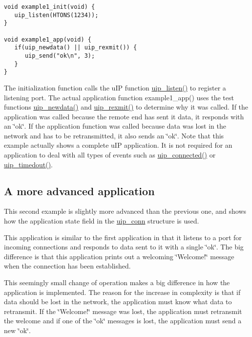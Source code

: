 \footnotesize\begin{verbatim}void example1_init(void) {
   uip_listen(HTONS(1234));
}

void example1_app(void) {
   if(uip_newdata() || uip_rexmit()) {
      uip_send("ok\n", 3);
   }
}
\end{verbatim}
\normalsize


The initialization function calls the u\-IP function \hyperlink{a00064_gdd1ab3704ecd4900eec61a6897d32dc8}{uip\_\-listen()} to register a listening port. The actual application function example1\_\-app() uses the test functions \hyperlink{a00064_g26a14b8dae3f861830af9e7cf1e03725}{uip\_\-newdata()} and \hyperlink{a00064_ga8933ad15a2e2947dae4a5cff50e6007}{uip\_\-rexmit()} to determine why it was called. If the application was called because the remote end has sent it data, it responds with an \char`\"{}ok\char`\"{}. If the application function was called because data was lost in the network and has to be retransmitted, it also sends an \char`\"{}ok\char`\"{}. Note that this example actually shows a complete u\-IP application. It is not required for an application to deal with all types of events such as \hyperlink{a00064_gdb971fb1525d0c5002f52125b05f3218}{uip\_\-connected()} or \hyperlink{a00064_g7b2ac4b18bd2ac3912fe67b3b17158c3}{uip\_\-timedout()}.\hypertarget{main_example2}{}\subsection{A more advanced application}\label{main_example2}
This second example is slightly more advanced than the previous one, and shows how the application state field in the \hyperlink{a00028}{uip\_\-conn} structure is used.

This application is similar to the first application in that it listens to a port for incoming connections and responds to data sent to it with a single \char`\"{}ok\char`\"{}. The big difference is that this application prints out a welcoming \char`\"{}Welcome!\char`\"{} message when the connection has been established.

This seemingly small change of operation makes a big difference in how the application is implemented. The reason for the increase in complexity is that if data should be lost in the network, the application must know what data to retransmit. If the \char`\"{}Welcome!\char`\"{} message was lost, the application must retransmit the welcome and if one of the \char`\"{}ok\char`\"{} messages is lost, the application must send a new \char`\"{}ok\char`\"{}.

